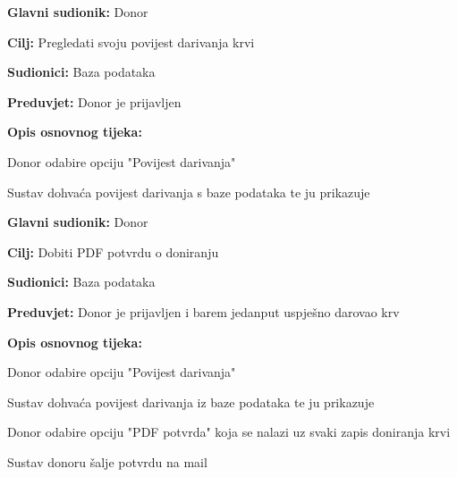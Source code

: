 					\begin{packed_item}
	
						\item \textbf{Glavni sudionik: }Donor
						\item \textbf{Cilj:} Pregledati svoju povijest darivanja krvi
						\item \textbf{Sudionici:} Baza podataka
						\item \textbf{Preduvjet:} Donor je prijavljen
						\item \textbf{Opis osnovnog tijeka:}
						
						\item[] \begin{packed_enum}
	
							\item Donor odabire opciju "Povijest darivanja"
							\item Sustav dohvaća povijest darivanja s baze podataka te ju prikazuje
							
						\end{packed_enum}

					\end{packed_item}
\eject 
\noindent {}
					\begin{packed_item}
	
						\item \textbf{Glavni sudionik:} Donor
						\item \textbf{Cilj:} Dobiti PDF potvrdu o doniranju
						\item \textbf{Sudionici:} Baza podataka
						\item \textbf{Preduvjet:} Donor je prijavljen i barem jedanput uspješno darovao krv
						\item \textbf{Opis osnovnog tijeka:}
						
						\item[] \begin{packed_enum}
	
							\item Donor odabire opciju "Povijest darivanja"
							\item Sustav dohvaća povijest darivanja iz baze podataka te ju prikazuje
							\item Donor odabire opciju "PDF potvrda" koja se nalazi uz svaki zapis doniranja krvi
							\item Sustav donoru šalje potvrdu na mail
							
						\end{packed_enum}

					\end{packed_item}

